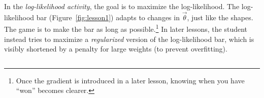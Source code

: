 \documentclass[11pt,letterpaper]{article}
\newcommand{\Note}[1]{}
\newcommand{\NoteSigned}[3]{{\sethlcolor{#2}\Note{#1: #3}}}
\newcommand{\NoteFF}[1]{\NoteSigned{FF}{LightBlue}{#1}}
\begin{document}
In the \textit{log-likelihood activity}, the goal is to maximize the
log-likelihood.  The log-likelihood bar (Figure~\ref{fig:lesson1})
adapts to changes in $\vec{\theta}$, just like the shapes. The game is
to make the bar as long as possible.\footnote{Once the gradient is
  introduced in a later lesson, knowing when you have ``won'' becomes
  clearer.}
In later lessons, the student instead tries to maximize a {\em regularized}
version of the log-likelihood bar, which is visibly shortened by a penalty for 
large weights (to prevent overfitting).

\begin{figure}[t]
\centering
\small
\begin{tabular}{
>{\centering\arraybackslash}m{} 
>{\centering\arraybackslash}m{}
>{\centering\arraybackslash}m{}
>{\centering\arraybackslash}m{}}


\end{tabular}
\end{figure}
\end{document}
